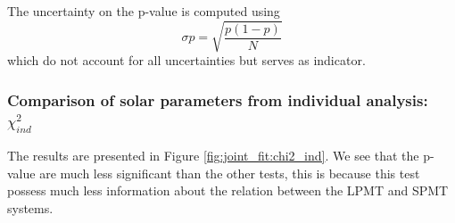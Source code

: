 \documentclass[../main.tex]{subfiles}
\begin{document}
The uncertainty on the p-value is computed using
\begin{equation}
  \sigma p = \sqrt{\frac{p(1-p)}{N}}
\end{equation}
which do not account for all uncertainties but serves as indicator.

\subsubsection{Comparison of solar parameters from individual analysis: $\chi^2_{ind}$}

The results are presented in Figure \ref{fig:joint_fit:chi2_ind}. We see that the p-value are much less significant than the other tests, this is because this test possess much less information about the relation between the LPMT and SPMT systems.
\end{document}
